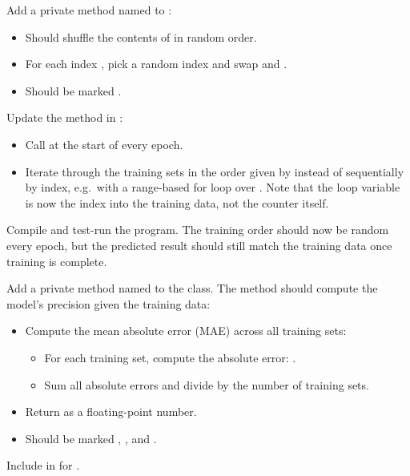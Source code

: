 \label{c2:ex:4}
Add a private method named  to :
\begin{itemize}
  \item Should shuffle the contents of  in random order.
  \item For each index , pick a random index  and swap  and
    .
  \item Should be marked .
\end{itemize}

\label{c2:ex:5}
Update the method  in :
\begin{itemize}
  \item Call  at the start of every epoch.
  \item Iterate through the training sets in the order given by  instead of
    sequentially by index, e.g.\ with a range-based for loop over . Note that the
    loop variable is now the index into the training data, not the counter itself.
\end{itemize}

\label{c2:ex:6}
Compile and test-run the program. The training order should now be random every epoch, but the
predicted result should still match the training data once training is complete.

\label{c2:set:2}

\label{c2:ex:7}
Add a private method named  to the  class. The method should compute
the model's precision given the training data:
\begin{itemize}
  \item Compute the mean absolute error (MAE) across all training sets:
  \begin{itemize}
    \item For each training set, compute the absolute error: .
    \item Sum all absolute errors and divide by the number of training sets.
  \end{itemize}
  \item Return  as a floating-point number.
  \item Should be marked \code{[[nodiscard]]}, , and .
\end{itemize}
Include  in  for .

